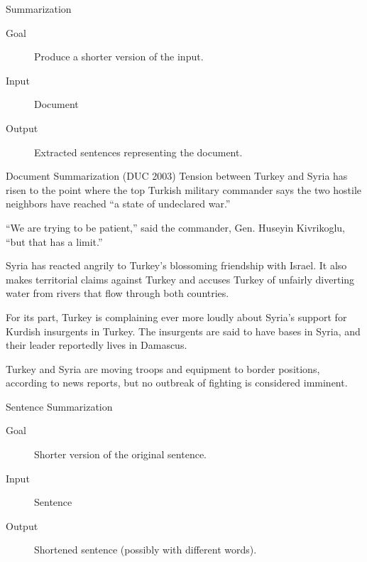\documentclass{beamer}
\begin{document}
\begin{frame}{Summarization}
  \begin{description}
  \item[Goal] Produce a shorter version of the input.
  \item[Input] Document
  \item[Output] Extracted sentences representing the document.
  \end{description}  

\end{frame}

\begin{frame}[fragile]{Document Summarization (DUC 2003)}
   Tension between Turkey and Syria has risen to
the point where the top Turkish military commander says the two
hostile neighbors have reached ``a state of undeclared war.''

   ``We are trying to be patient,'' said the commander, Gen.
Huseyin Kivrikoglu, ``but that has a limit.''

   Syria has reacted angrily to Turkey's blossoming friendship with
Israel. It also makes territorial claims against Turkey and accuses
Turkey of unfairly diverting water from rivers that flow through
both countries.

   For its part, Turkey is complaining ever more loudly about
Syria's support for Kurdish insurgents in Turkey. The insurgents
are said to have bases in Syria, and their leader reportedly lives
in Damascus.

   Turkey and Syria are moving troops and equipment to border
positions, according to news reports, but no outbreak of fighting
is considered imminent.


\end{frame}

\begin{frame}{Sentence Summarization}
  \begin{description}
  \item[Goal] Shorter version of the original sentence.
  \item[Input] Sentence
  \item[Output] Shortened sentence (possibly with different words).
  \end{description}  
\end{frame}
\end{document}

